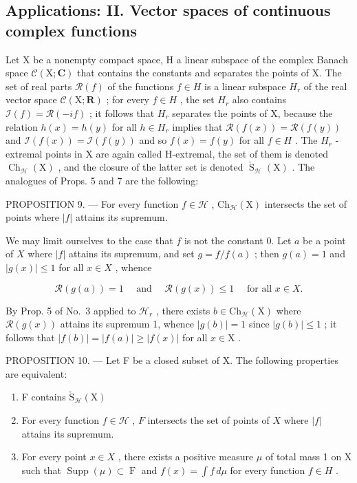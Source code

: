 \subsection{Applications: II. Vector spaces of continuous complex functions}

Let X be a nonempty compact space, H a linear subspace of the complex Banach space \(\mathcal{C}(\mathrm{X};\mathbf{C})\) that contains the constants and separates the points of X. The set of real parts \(\mathcal{R}(f)\) of the functions \(f \in H\) is a linear subspace \(H_{r}\) of the real vector space \(\mathcal{C}(\mathrm{X};\mathbf{R})\) ; for every \(f \in H\) , the set \(H_{r}\) also contains \(\mathcal{I}(f) = \mathcal{R}(-if)\) ; it follows that \(H_{r}\) separates the points of X, because the relation \(h(x) = h(y)\) for all \(h \in H_{r}\) implies that \(\mathcal{R}(f(x)) = \mathcal{R}(f(y))\) and \(\mathcal{I}(f(x)) = \mathcal{I}(f(y))\) and so \(f(x) = f(y)\) for all \(f \in H\) . The \(H_{r}\) -extremal points in X are again called H-extremal, the set of them is denoted \(\operatorname{Ch}_{\mathcal{H}}(\mathrm{X})\) , and the closure of the latter set is denoted \(\check{\operatorname{S}}_{\mathcal{H}}(\mathrm{X})\) . The analogues of Props. 5 and 7 are the following:

PROPOSITION 9. --- For every function \(f \in \mathcal{H}\) , \(\mathrm{Ch}_{\mathcal{H}}(\mathrm{X})\) intersects the set of points where \(|f|\) attains its supremum.

We may limit ourselves to the case that \(f\) is not the constant 0. Let \(a\) be a point of \(X\) where \(|f|\) attains its supremum, and set \(g = f / f(a)\) ; then \(g(a) = 1\) and \(|g(x)| \leqslant 1\) for all \(x \in X\) , whence

\[
\mathscr {R} (g (a)) = 1 \quad \text { and } \quad \mathscr {R} (g (x)) \leqslant 1 \quad \text { for   all } x \in X.
\]

By Prop. 5 of No.~3 applied to \(\mathcal{H}_r\) , there exists \(b \in \mathrm{Ch}_{\mathcal{H}}(\mathrm{X})\) where \(\mathcal{R}(g(x))\) attains its supremum 1, whence \(|g(b)| = 1\) since \(|g(b)| \leqslant 1\) ; it follows that \(|f(b)| = |f(a)| \geqslant |f(x)|\) for all \(x \in \mathrm{X}\) .

PROPOSITION 10. --- Let F be a closed subset of X. The following properties are equivalent:

\begin{enumerate}
\def\labelenumi{\alph{enumi})}
\item
  F contains \(\check{\mathrm{S}}_{\mathcal{H}}(\mathrm{X})\)
\item
  For every function \(f \in \mathcal{H}\) , \(F\) intersects the set of points of \(X\) where \(|f|\) attains its supremum.
\item
  For every point \(x \in X\) , there exists a positive measure \(\mu\) of total mass 1 on X such that \(\operatorname{Supp}(\mu) \subset \operatorname{F}\) and \(f(x) = \int f \, d\mu\) for every function \(f \in H\) .
\end{enumerate}

